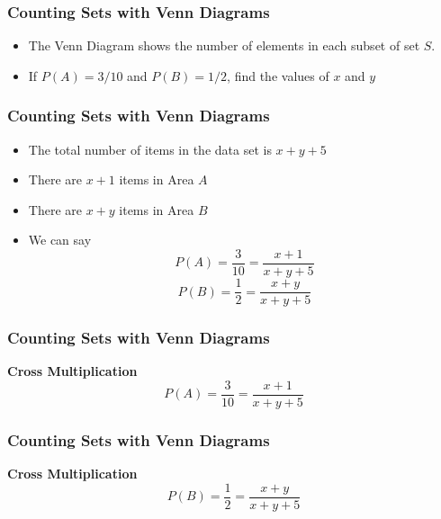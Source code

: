 \documentclass{beamer}
\begin{document}
\begin{frame}

\end{frame}
\begin{frame}
\frametitle{Counting Sets with Venn Diagrams}
\Large
\vspace{-2cm}
\begin{itemize}
\item The Venn Diagram shows the number of elements in each subset of set $S$.
\item If $P(A) = 3/10$ and $P(B) = 1/2$, find the values of $x$ and $y$
\end{itemize}
\end{frame}



\begin{frame}
\frametitle{Counting Sets with Venn Diagrams}
\Large
\vspace{-1cm}
\begin{itemize}
\item The total number of items in the data set is $x+y+5$
\item There are $x+1$ items in Area $A$
\item There are $x+y$ items in Area $B$
\item We can say
\[ P(A) = \frac{3}{10} = \frac{x+1}{x+y+5}\]
\[ P(B) = \frac{1}{2} = \frac{x+y}{x+y+5} \]
\end{itemize}
\end{frame}



\begin{frame}
\frametitle{Counting Sets with Venn Diagrams}
\Large
\vspace{-2.5cm}
\textbf{Cross Multiplication}
\[ P(A) = \frac{3}{10} = \frac{x+1}{x+y+5}\]

\end{frame}


\begin{frame}
\frametitle{Counting Sets with Venn Diagrams}
\Large
\vspace{-2.5cm}
\textbf{Cross Multiplication}
\[ P(B) = \frac{1}{2} = \frac{x+y}{x+y+5} \]

\end{frame}
\end{document}

